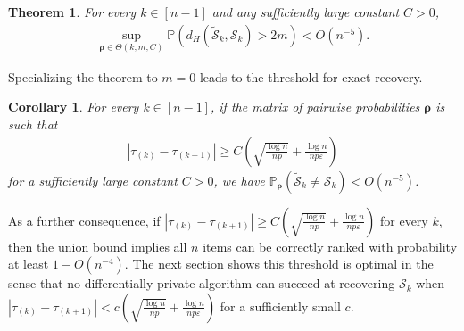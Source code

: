 \documentclass[letterpaper,12pt]{article}
\numberwithin{equation}{section}
\theoremstyle{plain}
\newtheorem{Theorem}{Theorem}
\numberwithin{Theorem}{section}
\newtheorem{corollary}{Corollary}
\numberwithin{corollary}{section}
\numberwithin{proposition}{section}
\numberwithin{Lemma}{section}
{
	\theoremstyle{definition}
	\newtheorem{Definition}{Definition}
	\newtheorem{example}{Example}
	\numberwithin{example}{section}
	\newtheorem{fact}{Fact}
	\numberwithin{fact}{section}
	\newtheorem{remark}{Remark}
}
\newcommand{\Pro}{\mathbb{P}}
\newcommand{\1}{\mathbbm{1}}
\begin{document}
\begin{Theorem}\label{thm: ranking nonparametric upper bound}
	For every $k \in [n-1]$ and any sufficiently large constant $C > 0$, 
	\begin{align}\label{eq: ranking nonparametric upper bound}
		\sup_{\bm \rho \in \Theta(k, m, C)} \Pro\left(d_H(\widetilde {\mathcal S}_k, \mathcal S_k) > 2m \right) < O(n^{-5}).
	\end{align}
\end{Theorem}
Specializing the theorem to $m = 0$ leads to the threshold for exact recovery.
\begin{corollary}
	For every $k \in [n-1]$, if the matrix of pairwise probabilities $\bm \rho$ is such that
	\begin{align*}
		|\tau_{(k)} - \tau_{(k+1)}| \geq C \left(\sqrt{\frac{\log n}{np}} + \frac{\log n}{np\varepsilon}\right)
	\end{align*}
	for a sufficiently large constant $C > 0$, we have $\Pro_{\bm \rho}\left(\widetilde {\mathcal S}_k \neq \mathcal S_k \right) < O(n^{-5})$.
\end{corollary}
As a further consequence, if $|\tau_{(k)} - \tau_{(k+1)}| 
\geq C\left( \sqrt{\frac{\log n}{np}} + \frac{\log n}{np\varepsilon}\right)$ for every $k$, then the union bound implies all $n$ items can be correctly ranked with probability at least $1 - O(n^{-4})$. The next section shows this threshold is optimal in the sense that no differentially private algorithm can succeed at recovering $\mathcal S_k$ when $|\tau_{(k)} - \tau_{(k+1)}| 
< c\left( \sqrt{\frac{\log n}{np}} + \frac{\log n}{np\varepsilon}\right)$ for a sufficiently small $c$.

\vspace{-2mm}
\end{document}
